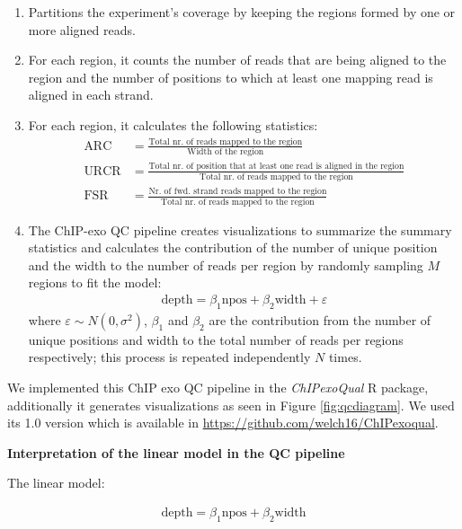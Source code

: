 \documentclass{bmcart}
\begin{document}
\begin{enumerate}
\item Partitions the experiment's coverage by keeping the regions
  formed by one or more aligned reads.
\item For each region, it counts the number of reads that are being
  aligned to the region and the number of positions to which at least
  one mapping read is aligned in each strand.
\item For each region, it calculates the following statistics:
  \begin{align*}
    \mbox{ARC} &= \frac{\text{Total nr. of reads mapped to the region}}{\text{Width of the region}} \\
    \mbox{URCR} &= \frac{\text{Total nr. of position that at least
        one read is aligned in the region}}{\text{Total nr. of reads mapped 
              to the region}} \\
    \mbox{FSR} &= \frac{\text{Nr. of fwd. strand reads mapped to the region}}                 {\text{Total nr. of reads mapped to the region}} 
  \end{align*}
\item The ChIP-exo QC pipeline creates visualizations to summarize the
  summary statistics and calculates the contribution of the number of
  unique position and the width to the number of reads per region by
  randomly sampling $M$ regions to fit the model:
  \begin{align*}
    \mbox{depth} = \beta_1 \mbox{npos} + \beta_2 \mbox{width} + \varepsilon
  \end{align*}
  where $\varepsilon \sim N(0,\sigma^2)$, $\beta_1$ and $\beta_2$ are
  the contribution from the number of unique positions and width to
  the total number of reads per regions respectively; this process is
  repeated independently $N$ times. 
\end{enumerate}

We implemented this ChIP exo QC pipeline in the \emph{ChIPexoQual} R
package, additionally it generates visualizations as seen in Figure
\ref{fig:qcdiagram}. We used its 1.0 version which is available in
\url{https://github.com/welch16/ChIPexoqual}.

\textbf{Interpretation of the linear model in the QC pipeline}

The linear model:

\begin{align*}
  \mbox{depth} = \beta_1 \mbox{npos} + \beta_2 \mbox{width}
\end{align*}
\end{document}
